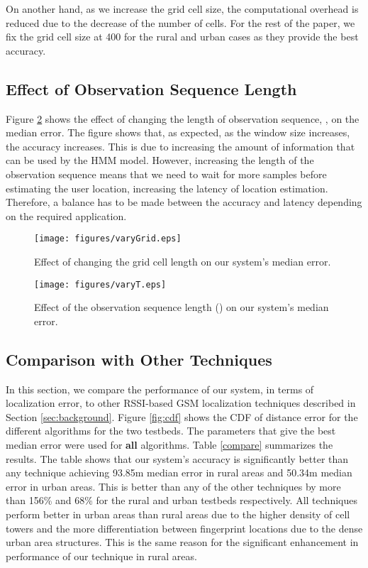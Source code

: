 \documentclass[conference]{IEEEtran}
\begin{document}
On another hand, as we increase the grid cell size, the
computational overhead is reduced due to the decrease of the number
of cells. For the rest of the paper, we fix the grid cell size at
400 for the rural and urban cases as they provide the best accuracy.

\subsection{Effect of Observation Sequence Length}
Figure \ref{fig:grid_W} shows the effect of changing the length of
observation sequence, , on the median error. The figure shows
that, as expected, as the window size increases, the accuracy
increases. This is due to increasing the amount of information that
can be used by the HMM model. However, increasing the length of the
observation sequence means that we need to wait for more samples
before estimating the user location, increasing the latency of
location estimation. Therefore, a balance has to be made between the
accuracy and latency depending on the required application.




\begin{figure}[!t]
    \centering
\texttt{[image: figures/varyGrid.eps]}
            \caption{Effect of changing the grid cell length on our system's median error.}
    \label{fig:grid_cell}
\end{figure}

 \begin{figure}[!t]
    \centering
\texttt{[image: figures/varyT.eps]}
            \caption{Effect of the observation sequence length () on our system's median error.}
    \label{fig:grid_W}
\end{figure}






\subsection{Comparison with Other Techniques}
In this section, we compare the performance of our system, in terms
of localization error, to other RSSI-based GSM localization
techniques described in Section \ref{sec:background}. Figure
\ref{fig:cdf} shows the CDF of distance error for the different
algorithms for the two testbeds. The parameters that give the best
median error were used for \textbf{all} algorithms. Table
\ref{compare} summarizes the results. The table shows that our
system's accuracy is significantly better than any technique
achieving 93.85m median error in rural areas and 50.34m median error
in urban areas. This is better than any of the other techniques by
more than 156\% and 68\% for the rural and urban testbeds
respectively. All techniques perform better in urban areas than
rural areas due to the higher density of cell towers and the more
differentiation between fingerprint locations due to the dense urban
area structures. This is the same reason for the significant
enhancement in performance of our technique in rural areas.
\end{document}
